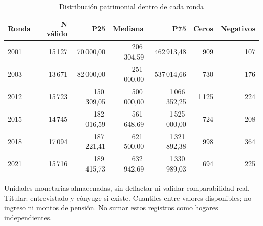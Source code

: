 \begin{table}[!htbp]
\centering
\caption{Distribución patrimonial dentro de cada ronda}\label{tab:eda-simple-patrimonio}
\small\setlength{\tabcolsep}{4pt}
\renewcommand{\arraystretch}{1.15}
\begin{tabular}{lrrrrrr}
\toprule
\textbf{Ronda} & \textbf{N válido} & \textbf{P25} & \textbf{Mediana} & \textbf{P75} & \textbf{Ceros} & \textbf{Negativos} \\
\midrule
2001 & 15\,127 & 70\,000,00 & 206\,304,59 & 462\,913,48 & 909 & 107 \\
2003 & 13\,671 & 82\,000,00 & 251\,000,00 & 537\,014,66 & 730 & 176 \\
2012 & 15\,723 & 150\,309,05 & 500\,000,00 & 1\,066\,352,25 & 1\,125 & 224 \\
2015 & 14\,745 & 182\,016,59 & 561\,648,69 & 1\,525\,000,00 & 724 & 208 \\
2018 & 17\,094 & 187\,221,41 & 621\,500,00 & 1\,321\,892,38 & 998 & 364 \\
2021 & 15\,716 & 189\,415,73 & 632\,942,69 & 1\,330\,989,03 & 694 & 225 \\
\bottomrule
\end{tabular}
\par\medskip
\parbox{\linewidth}{\footnotesize Unidades monetarias almacenadas, sin deflactar ni validar comparabilidad real. Titular: entrevistado y cónyuge si existe. Cuantiles entre valores disponibles; no ingreso ni montos de pensión. No sumar estos registros como hogares independientes.}
\end{table}
